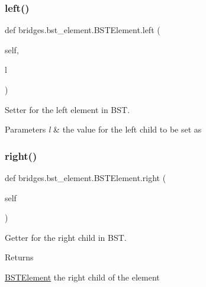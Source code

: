 \subsubsection{\texorpdfstring{left()}{left()}\hspace{0.1cm}{\footnotesize\ttfamily [2/2]}}
{\footnotesize\ttfamily def bridges.\+bst\+\_\+element.\+B\+S\+T\+Element.\+left (\begin{DoxyParamCaption}\item[{}]{self,  }\item[{}]{l }\end{DoxyParamCaption})}



Setter for the left element in B\+ST. 


\begin{DoxyParams}{Parameters}
{\em l} & the value for the left child to be set as \\
\hline
\end{DoxyParams}
\mbox{\label{classbridges_1_1bst__element_1_1_b_s_t_element_a3ec82fbc56a5e6309b69d2d963b483fd}} 
\subsubsection{\texorpdfstring{right()}{right()}\hspace{0.1cm}{\footnotesize\ttfamily [1/2]}}
{\footnotesize\ttfamily def bridges.\+bst\+\_\+element.\+B\+S\+T\+Element.\+right (\begin{DoxyParamCaption}\item[{}]{self }\end{DoxyParamCaption})}



Getter for the right child in B\+ST. 

\begin{DoxyReturn}{Returns}


\hyperlink{classbridges_1_1bst__element_1_1_b_s_t_element}{B\+S\+T\+Element} the right child of the element 
\end{DoxyReturn}
\mbox{\label{classbridges_1_1bst__element_1_1_b_s_t_element_a978ae0db366dee59703ed266eebca0e9}} 
